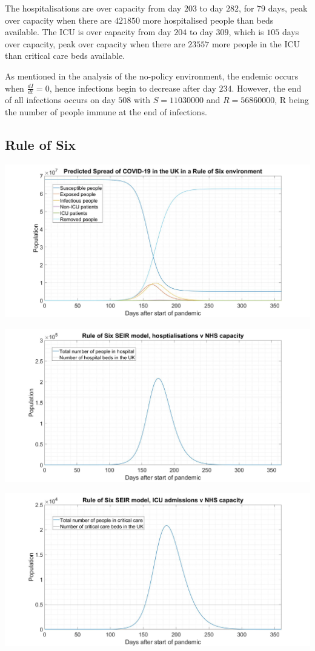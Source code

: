 \documentclass[11pt]{article}
\begin{document}
The hospitalisations are over capacity from day $203$ to day $282$, for $79$ days, peak over capacity when there are $421850$ more hospitalised people than beds available. The ICU is over capacity from day $204$ to day $309$, which is $105$ days over capacity, peak over capacity when there are $23557$ more people in the ICU than critical care beds available. \par
As mentioned in the analysis of the no-policy environment, the endemic occurs when $\frac{dI}{dt}=0$, hence infections begin to decrease after day $234$. However, the end of all infections occurs on day $508$ with $S=11030000$ and $R=56860000$, R being the number of people immune at the end of infections.
\subsection{Rule of Six}
\begin{center}
\includegraphics[width=1\textwidth]{ROSSEIHR.jpg} 

\includegraphics[width=1\textwidth]{ROSH.jpg} 

\includegraphics[width=1\textwidth]{ROSHICU.jpg} 
\end{center}
\end{document}
